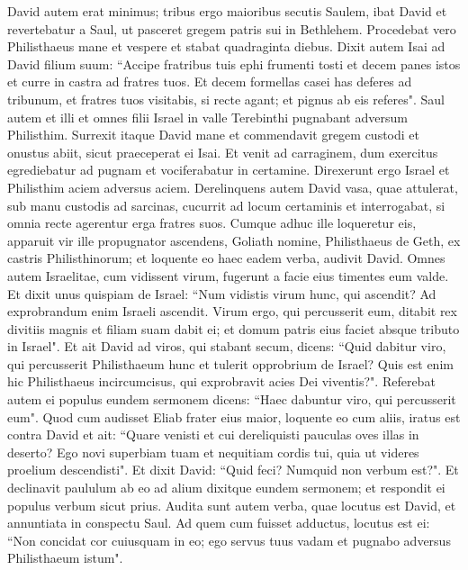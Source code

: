 \begin{biblechapter}
\verse David autem erat minimus; tribus ergo maioribus secutis Saulem, 
\verse ibat David et revertebatur a Saul, ut pasceret gregem patris sui in Bethlehem. 
\verse Procedebat vero Philisthaeus mane et vespere et stabat quadraginta diebus. 
\verse Dixit autem Isai ad David filium suum: “Accipe fratribus tuis ephi frumenti tosti et decem panes istos et curre in castra ad fratres tuos. 
\verse Et decem formellas casei has deferes ad tribunum, et fratres tuos visitabis, si recte agant; et pignus ab eis referes". 
\verse Saul autem et illi et omnes filii Israel in valle Terebinthi pugnabant adversum Philisthim. 
\verse Surrexit itaque David mane et commendavit gregem custodi et onustus abiit, sicut praeceperat ei Isai. Et venit ad carraginem, dum exercitus egrediebatur ad pugnam et vociferabatur in certamine. 
\verse Direxerunt ergo Israel et Philisthim aciem adversus aciem. 
\verse Derelinquens autem David vasa, quae attulerat, sub manu custodis ad sarcinas, cucurrit ad locum certaminis et interrogabat, si omnia recte agerentur erga fratres suos. 
\verse Cumque adhuc ille loqueretur eis, apparuit vir ille propugnator ascendens, Goliath nomine, Philisthaeus de Geth, ex castris Philisthinorum; et loquente eo haec eadem verba, audivit David. 
\verse Omnes autem Israelitae, cum vidissent virum, fugerunt a facie eius timentes eum valde. 
\verse Et dixit unus quispiam de Israel: “Num vidistis virum hunc, qui ascendit? Ad exprobrandum enim Israeli ascendit. Virum ergo, qui percusserit eum, ditabit rex divitiis magnis et filiam suam dabit ei; et domum patris eius faciet absque tributo in Israel". 
\verse Et ait David ad viros, qui stabant secum, dicens: “Quid dabitur viro, qui percusserit Philisthaeum hunc et tulerit opprobrium de Israel? Quis est enim hic Philisthaeus incircumcisus, qui exprobravit acies Dei viventis?". 
\verse Referebat autem ei populus eundem sermonem dicens: “Haec dabuntur viro, qui percusserit eum". 
\verse Quod cum audisset Eliab frater eius maior, loquente eo cum aliis, iratus est contra David et ait: “Quare venisti et cui dereliquisti pauculas oves illas in deserto? Ego novi superbiam tuam et nequitiam cordis tui, quia ut videres proelium descendisti". 
\verse Et dixit David: “Quid feci? Numquid non verbum est?". 
\verse Et declinavit paululum ab eo ad alium dixitque eundem sermonem; et respondit ei populus verbum sicut prius. 
\verse Audita sunt autem verba, quae locutus est David, et annuntiata in conspectu Saul. 
\verse Ad quem cum fuisset adductus, locutus est ei: “Non concidat cor cuiusquam in eo; ego servus tuus vadam et pugnabo adversus Philisthaeum istum".  

\end{biblechapter}
